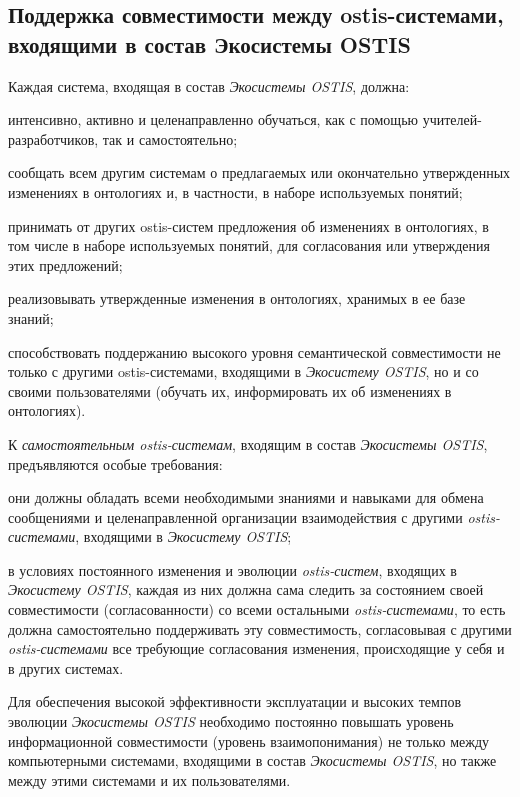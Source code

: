 \subsection{Поддержка совместимости между ostis-системами, входящими в состав Экосистемы OSTIS}
{\label{sec_ecosystem_interoperability_support}} 

Каждая система, входящая в состав \textit{Экосистемы OSTIS}, должна:
\begin{textitemize}
    \item интенсивно, активно и целенаправленно обучаться, как с помощью учителей-разработчиков, так и самостоятельно;
    \item сообщать всем другим системам о предлагаемых или окончательно утвержденных изменениях в онтологиях и, в частности, в наборе используемых понятий;
    \item принимать от других ostis-систем предложения об изменениях в онтологиях, в том числе в наборе используемых понятий, для согласования или утверждения этих предложений;
    \item реализовывать утвержденные изменения в онтологиях, хранимых в ее базе знаний;
    \item способствовать поддержанию высокого уровня семантической совместимости не только с другими ostis-системами, входящими в \textit{Экосистему OSTIS}, но и со своими пользователями (обучать их, информировать их об изменениях в онтологиях).
\end{textitemize}

К \textit{самостоятельным ostis-системам}, входящим в состав \textit{Экосистемы OSTIS}, предъявляются особые требования:
\begin{textitemize}
    \item они должны обладать всеми необходимыми знаниями и навыками для обмена сообщениями и целенаправленной организации взаимодействия с другими \textit{ostis-системами}, входящими в \textit{Экосистему OSTIS};
    \item в условиях постоянного изменения и эволюции \textit{ostis-систем}, входящих в \textit{Экосистему OSTIS}, каждая из них должна сама следить за состоянием своей совместимости (согласованности) со всеми остальными \textit{ostis-системами}, то есть должна самостоятельно поддерживать эту совместимость, согласовывая с другими \textit{ostis-системами} все требующие согласования изменения, происходящие у себя и в других системах.
\end{textitemize}

Для обеспечения высокой эффективности эксплуатации и высоких темпов эволюции \textit{Экосистемы OSTIS} необходимо постоянно повышать уровень информационной совместимости (уровень взаимопонимания) не только между компьютерными системами, входящими в состав \textit{Экосистемы OSTIS}, но также между этими системами и их пользователями. 


